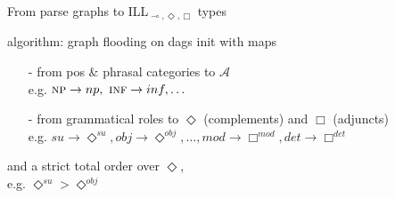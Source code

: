 \documentclass{beamer}
\newcommand{\li}{\!\multimap\!}
\begin{document}
\begin{frame}{From parse graphs to ILL$_{\li, \Diamond, \Box}$ types}
	\small
	\begin{block}{algorithm: graph flooding on dags}
		init with maps
		\begin{itemize}
			\item[-] from pos \& phrasal categories to $\mathcal{A}$	\\
			\quad e.g. $\textsc{np} \to np,\ \textsc{inf} \to inf, \dots$
			\item[-] from grammatical roles to $\Diamond$ (complements) and $\Box$ (adjuncts)\\
			\quad e.g. $su \to \Diamond^{su}, obj \to \Diamond^{obj}, \dots, mod \to \Box^{mod}, det \to \Box^{det}$
		\end{itemize}
		and a strict total order over $\Diamond$, \\
		e.g. $\Diamond^{su} > \Diamond^{obj}$
	\end{block}
\end{frame}
\end{document}
